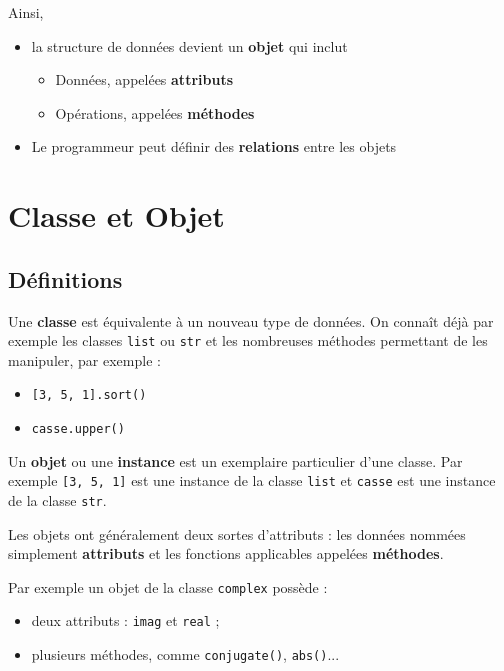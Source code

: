 \documentclass[%
oneside,                 %
final,                   %
10pt]{article}
\begin{document}
\noindent
Ainsi,
\begin{itemize}
\item la structure de données devient un \textbf{objet} qui inclut
\begin{itemize}

 \item Données, appelées \textbf{attributs}

 \item Opérations, appelées \textbf{méthodes}

\end{itemize}

\noindent
\item Le programmeur peut définir des \textbf{relations} entre les objets
\end{itemize}

\noindent
\section{Classe et Objet}
\subsection{Définitions}
Une \textbf{classe} est équivalente à un nouveau type de données. On connaît déjà par exemple les classes \texttt{list} ou \texttt{str} et les nombreuses méthodes permettant de les manipuler, par exemple :
\begin{itemize}
\item \texttt{[3, 5, 1].sort()}

\item \texttt{casse.upper()}
\end{itemize}

\noindent
Un \textbf{objet} ou une \textbf{instance} est un exemplaire particulier d'une classe. Par exemple \texttt{[3, 5, 1]} est une instance de la classe \texttt{list} et \texttt{casse} est une instance de la classe \texttt{str}.

Les objets ont généralement deux sortes d'attributs : les données nommées simplement \textbf{attributs} et les fonctions applicables appelées \textbf{méthodes}.

Par exemple un objet de la classe \texttt{complex} possède :
\begin{itemize}
\item deux attributs : \texttt{imag} et \texttt{real} ;

\item plusieurs méthodes, comme \texttt{conjugate()}, \texttt{abs()}...
\end{itemize}
\end{document}
